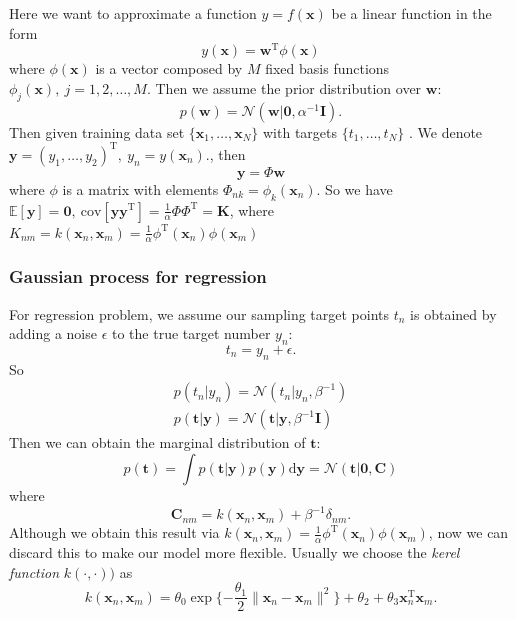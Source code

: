 \documentclass[a4paper]{book}
\newcommand{\normD}{\mathcal{N}}
\newcommand{\mrm}{\mathrm}
\newcommand{\mbf}{\mathbf}
\newcommand{\ud}{\mathrm{d}}
\newcommand{\KK}{\mbf K}
\newcommand{\CC}{\mbf C}
\newcommand{\ww}{\mbf w}
\newcommand{\ttt}{\mbf t}
\newcommand{\xx}{\mbf x}
\newcommand{\yy}{\mbf y}
\newcommand{\bmz}{\bm{0}}
\newcommand{\Exp}{\mathbb{E}}
\newcommand{\rev}{^{-1}}
\newcommand{\trans}{^{\mrm T}}
\begin{document}
Here we want to approximate a function $y= f(\xx)$ be a linear function in the form
\begin{equation}
    y(\xx) = \ww\trans\phi(\xx)
\end{equation}
where $\phi(\xx)$ is a vector composed by $M$ fixed basis functions $\phi_j(\xx),\ j=1,2,\dots,M$. Then we assume the prior distribution over $\ww$:
\begin{equation}
    p(\ww) = \normD(\ww|\bmz, \alpha\rev\mbf I).
\end{equation}
Then given training data set $\{\xx_1, \dots, \xx_N\}$ with targets $\{t_1,\dots, t_N\}$ . We denote $\yy = (y_1,\dots, y_2)\trans,\ y_n=y(\xx_n).$, then
\begin{equation}
    \yy =  \Phi\ww
\end{equation}
where $\phi$ is a matrix with elements $\Phi_{nk}=\phi_k(\xx_n)$. So we have $\Exp[\yy]=\bmz,\ \mrm{cov}[\yy\yy\trans] = \frac{1}{\alpha}\Phi\Phi\trans=\KK$, where $K_{nm}=k(\xx_n,\xx_m)=\frac{1}{\alpha}\phi\trans(\xx_n)\phi(\xx_m)$

\subsubsection*{Gaussian process for regression}
For regression problem, we assume our sampling target points $t_n$ is obtained by adding a noise $\epsilon$ to the true target number $y_n$:
\begin{equation}
    t_n=y_n+\epsilon.
\end{equation}
So
\begin{gather}
    p(t_n|y_n)=\normD(t_n|y_n, \beta\rev) \\
    p(\ttt|\yy) = \normD(\ttt|\yy,\beta\rev\mbf I)
\end{gather}
Then we can obtain the marginal distribution of $\ttt$:
\begin{equation}
    p(\ttt) = \int p(\ttt|\yy)p(\yy)\ud\yy=\normD(\ttt|\bmz, \CC)
\end{equation}
where
\begin{equation}\label{eq13.1}
    \CC_{nm}=k(\xx_n,\xx_m)+\beta\rev\delta_{nm}.
\end{equation}
Although we obtain this result via $k(\xx_n,\xx_m) = \frac1\alpha\phi\trans(\xx_n)\phi(\xx_m)$, now we can discard this to make our model more flexible. Usually we choose the \emph{kerel function} $k(\cdot,\cdot))$ as
\begin{equation}
    k(\xx_n,\xx_m)=\theta_0\exp\{-\frac{\theta_1}{2}\|\xx_n-\xx_m\|^2\}+\theta_2+\theta_3\xx_n\trans\xx_m.
\end{equation}
\end{document}

